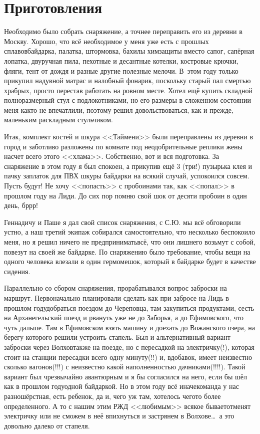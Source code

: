 \chapter{Приготовления} 

Необходимо было собрать снаряжение, а точнее переправить его из деревни в Москву. Хорошо, что всё необходимое у меня уже есть с прошлых сплавов\mdash  байдарка, палатка, штормовка, бахилы химзащиты вместо сапог, сапёрная лопатка, двуручная пила, пехотные и десантные котелки, костровые крючки, фляги, тент от дождя и разные другие полезные мелочи. В~этом году только прикупил надувной матрас и налобный фонарик, поскольку старый пал смертью храбрых, просто перестав работать на ровном месте. Хотел ещё купить складной полноразмерный стул с подлокотниками, но его размеры в сложенном состоянии меня как\sdash то не впечатлили, поэтому решил довольствоваться, как и прежде, маленьким раскладным стульчиком.

Итак, комплект костей и шкура <<Таймени>> были переправлены из деревни в город и заботливо разложены по комнате под неодобрительные реплики жены насчет всего этого <<хлама>>. Собственно, вот и вся подготовка. За снаряжение в этом году я был спокоен, а прикупив ещё 3 (три!) пузырька клея и пачку заплаток для ПВХ шкуры байдарки на всякий случай, успокоился совсем. Пусть будут! Не хочу <<попасть>> с пробоинами так, как <<попал>> в прошлом году на Лиди. До сих пор помню свой шок от десяти пробоин в один день, бр\sdash р\sdash р!

Геннадичу и Паше я дал свой список снаряжения, с С.Ю. мы всё обговорили устно, а наш третий экипаж собирался самостоятельно, что несколько беспокоило меня, но я решил ничего не предпринимать\mdash всё, что они лишнего возьмут с собой, повезут на своей же байдарке. По снаряжению было требование, чтобы вещи на одного человека влезали в один гермомешок, который в байдарке будет в качестве сидения.

Параллельно со сбором снаряжения, прорабатывался вопрос заброски на маршрут. Первоначально планировали сделать как при забросе на Лидь в прошлом году\mdash добраться поездом до Череповца, там закупиться продуктами, сесть на Арханегельский поезд и рвануть уже не до Заборья, а до Ефимовского, что чуть дальше. Там в Ефимовском взять машину и доехать до Вожанского озера, на берегу которого решили устроить стапель. Был и альтернативный вариант заброски через Волхов\mdash также на поезде, но с пересадкой на электричку(!), которая стоит на станции пересадки всего одну минуту(!!) и, вдобавок, имеет неизвестно сколько вагонов(!!!) с неизвестно какой наполненностью дачниками(!!!!). Такой вариант был чрезвычайно авантюрным и я бы согласился на него, если бы шёл как в прошлом году\mdash одной байдаркой. Но в этом году всё иначе\mdash команда у нас разношёрстная, есть ребенок, да и, чего уж там, хотелось чего\sdash то более определенного. А то с нашим этим РЖД <<любимым>> всякое бывает\mdash отменят электричку или не сможем в неё впихнуться и застрянем в Волхове\ldots~а это довольно далеко от стапеля.
 
